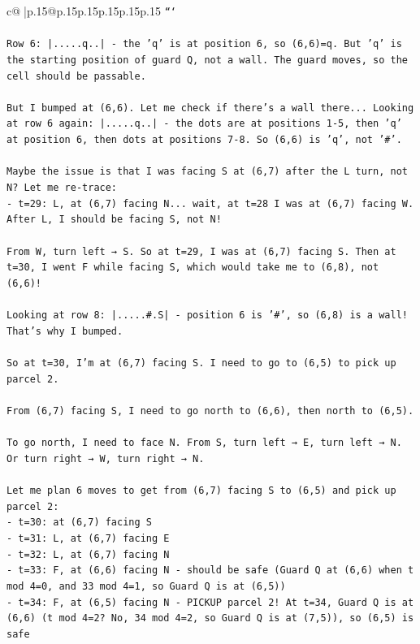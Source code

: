 \documentclass{article}
\begin{document}
{\begin{supertabular}{c@{$\;$}|p{.15\linewidth}@{}p{.15\linewidth}p{.15\linewidth}p{.15\linewidth}p{.15\linewidth}p{.15\linewidth}}
{{{\texttt{```} \\
\\ 
\texttt{Row 6: |.....q..| {-} the 'q' is at position 6, so (6,6)=q. But 'q' is the starting position of guard Q, not a wall. The guard moves, so the cell should be passable.} \\
\\ 
\texttt{But I bumped at (6,6). Let me check if there's a wall there... Looking at row 6 again: |.....q..| {-} the dots are at positions 1{-}5, then 'q' at position 6, then dots at positions 7{-}8. So (6,6) is 'q', not '\#'.} \\
\\ 
\texttt{Maybe the issue is that I was facing S at (6,7) after the L turn, not N? Let me re{-}trace:} \\
\texttt{{-} t=29: L, at (6,7) facing N... wait, at t=28 I was at (6,7) facing W. After L, I should be facing S, not N!} \\
\\ 
\texttt{From W, turn left → S. So at t=29, I was at (6,7) facing S. Then at t=30, I went F while facing S, which would take me to (6,8), not (6,6)!} \\
\\ 
\texttt{Looking at row 8: |.....\#.S| {-} position 6 is '\#', so (6,8) is a wall! That's why I bumped.} \\
\\ 
\texttt{So at t=30, I'm at (6,7) facing S. I need to go to (6,5) to pick up parcel 2.} \\
\\ 
\texttt{From (6,7) facing S, I need to go north to (6,6), then north to (6,5).} \\
\\ 
\texttt{To go north, I need to face N. From S, turn left → E, turn left → N. Or turn right → W, turn right → N.} \\
\\ 
\texttt{Let me plan 6 moves to get from (6,7) facing S to (6,5) and pick up parcel 2:} \\
\texttt{{-} t=30: at (6,7) facing S} \\
\texttt{{-} t=31: L, at (6,7) facing E} \\
\texttt{{-} t=32: L, at (6,7) facing N} \\
\texttt{{-} t=33: F, at (6,6) facing N {-} should be safe (Guard Q at (6,6) when t mod 4=0, and 33 mod 4=1, so Guard Q is at (6,5))} \\
\texttt{{-} t=34: F, at (6,5) facing N {-} PICKUP parcel 2! At t=34, Guard Q is at (6,6) (t mod 4=2? No, 34 mod 4=2, so Guard Q is at (7,5)), so (6,5) is safe} \\
}}}
\end{supertabular}}
\end{document}
